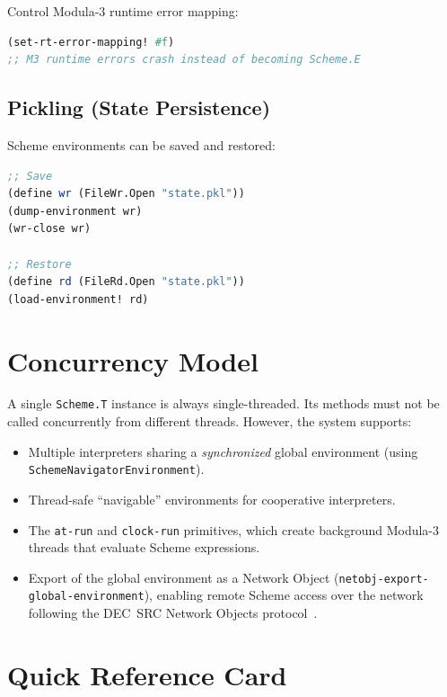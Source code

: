 \documentclass[12pt]{report}
\begin{document}
Control Modula-3 runtime error mapping:
\begin{lstlisting}[language=Scheme]
(set-rt-error-mapping! #f)
;; M3 runtime errors crash instead of becoming Scheme.E
\end{lstlisting}

\section{Pickling (State Persistence)}

Scheme environments can be saved and restored:

\begin{lstlisting}[language=Scheme]
;; Save
(define wr (FileWr.Open "state.pkl"))
(dump-environment wr)
(wr-close wr)

;; Restore
(define rd (FileRd.Open "state.pkl"))
(load-environment! rd)
\end{lstlisting}


\chapter{Concurrency Model}

A single {\tt Scheme.T} instance is always single-threaded.  Its
methods must not be called concurrently from different threads.
However, the system supports:

\begin{itemize}
\item Multiple interpreters sharing a \emph{synchronized} global
  environment (using {\tt SchemeNavigatorEnvironment}).
\item Thread-safe ``navigable'' environments for cooperative
  interpreters.
\item The {\tt at-run} and {\tt clock-run} primitives, which create
  background Modula-3 threads that evaluate Scheme expressions.
\item Export of the global environment as a Network Object
  ({\tt netobj-export-global-environment}), enabling remote Scheme
  access over the network following the DEC~SRC Network Objects
  protocol~\cite{netobj}.
\end{itemize}




\appendix
\chapter{Quick Reference Card}
\end{document}

